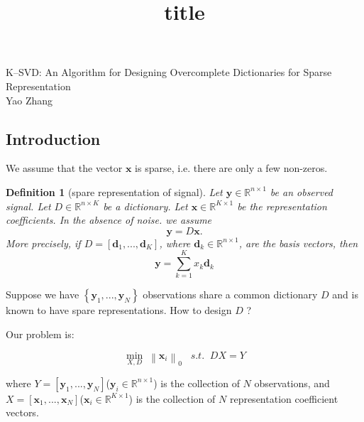 \documentclass[11pt]{article}
\newtheorem{definition}{Definition}[section]
\begin{document}
	
\setcounter{section}{1}
\title{title}
\thispagestyle{empty}

\begin{center}
	{\Large K--SVD: An Algorithm for Designing Overcomplete Dictionaries for Sparse Representation}\\
	\vspace{0.25cm}
	{Yao Zhang}
\end{center}

\subsection{Introduction}
We assume that the vector $ \boldsymbol{x} $ is sparse, i.e. there are only a few non-zeros.  

\begin{definition}[spare representation of signal]	
	Let $ \boldsymbol{y} \in \mathbb{R}^{n \times 1} $ be an observed signal. Let $ D \in \mathbb{R}^{n\times K} $ be a dictionary. Let $ \boldsymbol{x} \in \mathbb{R}^{K \times 1} $ be the representation coefficients. In the absence of noise. we assume
	\begin{equation}
	\boldsymbol{y} = D \boldsymbol{x}.
	\end{equation}
	More precisely, if $D = \left[ {\boldsymbol{d}_1},...,{{\boldsymbol{d}_K}} \right]$, where $ \boldsymbol{d}_{k} \in \mathbb{R}^{n\times 1} $, are the basis vectors, then 
		\begin{equation}
		\boldsymbol{y} = \sum\limits_{k = 1}^K {{x_k}{\boldsymbol{d}_k}} 
		\end{equation}
\end{definition}

Suppose we have $\left\{ {{\boldsymbol{y}_1},...,{\boldsymbol{y}_N}} \right\}$ observations share a common dictionary $ D $ and is known to have spare representations. How to design $ D $ ?

Our problem is:

\begin{equation}
\mathop {\min }\limits_{X,D} \;{\left\| {{\boldsymbol{x}_i}} \right\|_0}\;\;\;s.t.\;\;DX = Y
\label{eq1.3}
\end{equation}

where $Y = \left[ {{\boldsymbol{y}_1},...,{\boldsymbol{y}_N}} \right]$($ \boldsymbol{y}_i \in \mathbb{R}^{n\times 1} $) is the collection of $ N $ observations, and $X = \left[ {{\boldsymbol{x}_1},...,{\boldsymbol{x}_N}} \right]$($ \boldsymbol{x}_i \in \mathbb{R}^{K\times 1} $) is the collection of $ N $ representation coefficient vectors. 
\end{document}
